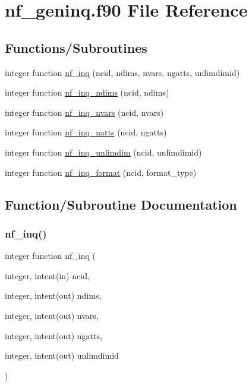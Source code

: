 \hypertarget{nf__geninq_8f90}{}\section{nf\+\_\+geninq.\+f90 File Reference}
\label{nf__geninq_8f90}
\subsection*{Functions/\+Subroutines}
\begin{DoxyCompactItemize}
\item 
integer function \hyperlink{nf__geninq_8f90_acbb572d3d217871ff6171ca1fd6be6d1}{nf\+\_\+inq} (ncid, ndims, nvars, ngatts, unlimdimid)
\item 
integer function \hyperlink{nf__geninq_8f90_adaff99094ef0a89a11d5c123fb81c44c}{nf\+\_\+inq\+\_\+ndims} (ncid, ndims)
\item 
integer function \hyperlink{nf__geninq_8f90_a3bdc31be1891a17db8be6800b5368714}{nf\+\_\+inq\+\_\+nvars} (ncid, nvars)
\item 
integer function \hyperlink{nf__geninq_8f90_a3b1a80b287fe67a26928a72ad829e69e}{nf\+\_\+inq\+\_\+natts} (ncid, ngatts)
\item 
integer function \hyperlink{nf__geninq_8f90_a37ae0d70b956662d97104cf1b836a738}{nf\+\_\+inq\+\_\+unlimdim} (ncid, unlimdimid)
\item 
integer function \hyperlink{nf__geninq_8f90_acaf45fd42a6db8c61cb8e97f3837cadf}{nf\+\_\+inq\+\_\+format} (ncid, format\+\_\+type)
\end{DoxyCompactItemize}


\subsection{Function/\+Subroutine Documentation}
\mbox{\label{nf__geninq_8f90_acbb572d3d217871ff6171ca1fd6be6d1}} 
\subsubsection{\texorpdfstring{nf\+\_\+inq()}{nf\_inq()}}
{\footnotesize\ttfamily integer function nf\+\_\+inq (\begin{DoxyParamCaption}\item[{integer, intent(in)}]{ncid,  }\item[{integer, intent(out)}]{ndims,  }\item[{integer, intent(out)}]{nvars,  }\item[{integer, intent(out)}]{ngatts,  }\item[{integer, intent(out)}]{unlimdimid }\end{DoxyParamCaption})}



